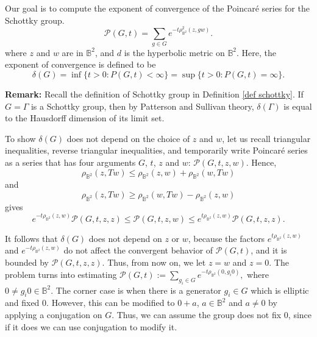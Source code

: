 \documentclass[12pt,oneside]{sfsuthesis}
\theoremstyle{plain} %
\theoremstyle{definition}  %
\theoremstyle{remark}  %
\theoremstyle{plain}
\begin{document}
{Our goal is to compute the exponent of convergence of the Poincar\'{e} series for the Schottky group.
$$
\mathcal{P}(G,  t) = \sum_{g\in G} e^{-t \rho_{\mathbb{B}^2}^2(z,gw)}.
$$
where $z$ and $w$ are in $\mathbb{B}^2$, and $d$ is the  hyperbolic metric on ${\mathbb B}^2$. Here, the exponent of convergence is defined to be 
$$
\delta (G) = \inf \{t>0: P(G,t)<\infty\} =  \sup \{t>0: P(G, t) = \infty\}. 
$$

\textbf{Remark:} Recall the definition of Schottky group in Definition \ref{def schottky}. If $G=\Gamma$ is a Schottky group, then by Patterson and Sullivan theory, $\delta(\Gamma)$ is equal to the Hausdorff dimension of its limit set. 

To show $\delta(G)$ does not depend on the choice of $z$ and $w$, let us recall triangular inequalities, reverse triangular inequalities, and temporarily write Poincar\'{e} series as a series that has four arguments $G$, $t$, $z$ and $w$: $\mathcal{P}(G,t,z,w)$. Hence,
$$
\rho_{\mathbb{B}^2}(z,Tw)\leq \rho_{\mathbb{B}^2}(z,w)+\rho_{\mathbb{B}^2}(w,Tw)
$$
and 
$$
\rho_{\mathbb{B}^2}(z,Tw)\geq \rho_{\mathbb{B}^2}(w,Tw)-\rho_{\mathbb{B}^2}(z,w)
$$
gives
$$
e^{-t\rho_{\mathbb{B}^2}(z,w)}\mathcal{P}(G,t,z,z)\leq \mathcal{P}(G,t,z,w) \leq e^{t\rho_{\mathbb{B}^2}(z,w)}\mathcal{P}(G,t,z,z).
$$

It follows that $\delta(G)$ does not depend on $z$ or $w$, because the factors $e^{t\rho_{\mathbb{B}^2}(z,w)}$ and $e^{-t\rho_{\mathbb{B}^2}(z,w)}$ do not affect the convergent behavior of $\mathcal{P}(G,t)$, and it is bounded by $\mathcal{P}(G,t,z,z)$. Thus, from now on, we let $z=w$ and $z=0$. The problem turns into estimating $\mathcal{P}(G,t):= \sum\limits_{g_i\in G}e^{-t\rho_{\mathbb{B}^2}(0,g_i0)},$ where $0\neq g_i0\in\mathbb{B}^2$. The corner case is when there is a generator $g_i\in G$ which is elliptic and fixed $0$. However, this can be modified to $0+a$, $a\in\mathbb{B}^2$ and $a\neq 0$ by applying a conjugation on $G$. Thus, we can assume the group does not fix $0$, since if it does we can use conjugation to modify it.





}
\end{document}
